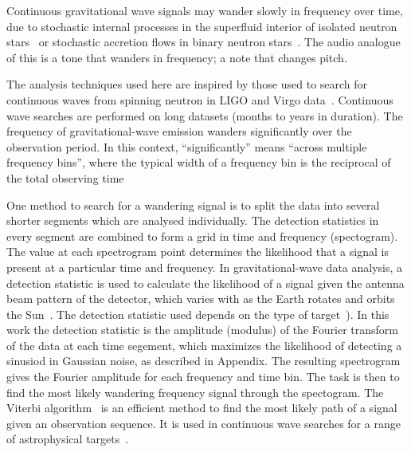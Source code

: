 \documentclass[paper-main.tex]{subfiles}
\begin{document}
 
Continuous gravitational wave signals may wander slowly in frequency over time, due to stochastic internal processes in the superfluid interior of isolated neutron stars~\cite{MelatosDouglassSimula:2015,Jones:2010} or stochastic accretion flows in binary neutron stars~\cite{BildstenTB:1998}. 
The audio analogue of this is a tone that wanders in frequency; a note that changes pitch. 


The analysis techniques used here are inspired by those used to search for continuous waves from spinning neutron in LIGO and Virgo data~\cite{SuvorovaEtAl:2016,SuvorovaEtAl:2017}.
Continuous wave searches are performed on long datasets (months to years in duration). 
The frequency of gravitational-wave emission wanders significantly over the observation period. 
In this context, ``significantly'' means ``across multiple frequency bins'', where the typical width of a frequency bin is the reciprocal of the total observing time~\cite{JKS:1998,ScoX1O2Viterbi:2019}

One method to search for a wandering signal is to split the data into several shorter segments which are analysed individually. 
The detection statistics in every segment are combined to form a grid in time and frequency (spectogram). 
The value at each spectrogram point determines the likelihood that a signal is present at a particular time and frequency. 
In gravitational-wave data analysis, a detection statistic is used to calculate the likelihood of a signal given the antenna beam pattern of the detector, which varies with as the Earth rotates and orbits the Sun~\cite{JKS:1998}.
The detection statistic used depends on the type of target~\cite{JKS:1998,SuvorovaEtAl:2017}). 
In this work the detection statistic is the amplitude (modulus) of the Fourier transform of the data at each time segement, which maximizes the likelihood of detecting a sinusiod in Gaussian noise, as described in Appendix.
The resulting spectrogram gives the Fourier amplitude for each frequency and time bin. 
The task is then to find the most likely wandering frequency signal through the spectogram. 
The Viterbi algorithm~\cite{Viterbi:1967} is an efficient method to find the most likely path of a signal given an observation sequence. 
It is used in continuous wave searches for a range of astrophysical targets~\cite{ScoX1O2Viterbi:2019,ScoX1ViterbiO1:2017,MillhouseStrangMelatos:2020,PostMergerRemnantSearch:2019,SunEtAlSNR:2018,viterbi_application}. 
 
\end{document}
